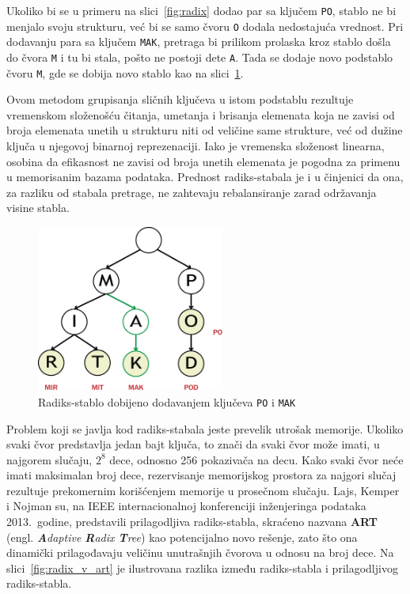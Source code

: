 \documentclass[12pt,oneside]{memoir}
\begin{document}
Ukoliko bi se u primeru na
slici~\ref{fig:radix} dodao par sa ključem \texttt{PO},
stablo ne bi menjalo svoju strukturu, već
bi se samo čvoru \texttt{O} dodala nedostajuća vrednost.
Pri dodavanju para sa ključem \texttt{MAK}, pretraga bi prilikom prolaska
kroz stablo došla do čvora \texttt{M} i tu bi stala,
pošto ne postoji dete \texttt{A}. Tada se dodaje novo podstablo
čvoru \texttt{M}, gde se dobija novo stablo kao na slici~\ref{fig:radix2}.


Ovom metodom grupisanja sličnih ključeva u
istom podstablu rezultuje vremenskom složenošću čitanja, umetanja i brisanja
elemenata koja ne zavisi od broja elemenata
unetih u strukturu niti od veličine same strukture, već od
dužine ključa u njegovoj binarnoj reprezenaciji. Iako je vremenska složenost linearna,
osobina da efikasnost ne zavisi od broja unetih elemenata je pogodna za primenu
u memorisanim bazama podataka. Prednost radiks-stabala je i u činjenici da ona,
za razliku od stabala pretrage, ne zahtevaju rebalansiranje zarad
održavanja visine stabla.

\begin{figure}[!h]
  \centering
  \includegraphics[width=0.55\textwidth]{radix_tree_2.eps}
  \caption{Radiks-stablo dobijeno dodavanjem ključeva \texttt{PO} i \texttt{MAK}}
  \label{fig:radix2}
\end{figure}

Problem koji se javlja kod radiks-stabala jeste prevelik utrošak memorije.
Ukoliko svaki čvor predstavlja jedan bajt ključa, to znači da
svaki čvor može imati, u najgorem slučaju, $ 2^{8} $ dece,
odnosno 256 pokazivača na decu.
Kako svaki čvor neće imati maksimalan broj dece, rezervisanje memorijskog prostora
za najgori slučaj rezultuje prekomernim korišćenjem memorije u prosečnom slučaju.
Lajs, Kemper i Nojman su, na IEEE internacionalnoj konferenciji inženjeringa
podataka 2013.\ godine, predstavili prilagodljiva radiks-stabla,
skraćeno nazvana \textbf{ART}~\cite{artful}
(engl. \emph{\textbf{A}daptive \textbf{R}adix \textbf{T}ree})
kao potencijalno novo rešenje, zato što ona dinamički
prilagođavaju veličinu unutrašnjih čvorova u odnosu na broj dece.
Na slici~\ref{fig:radix_v_art} je ilustrovana razlika između radiks-stabla i
prilagodljivog radiks-stabla.
\end{document}
